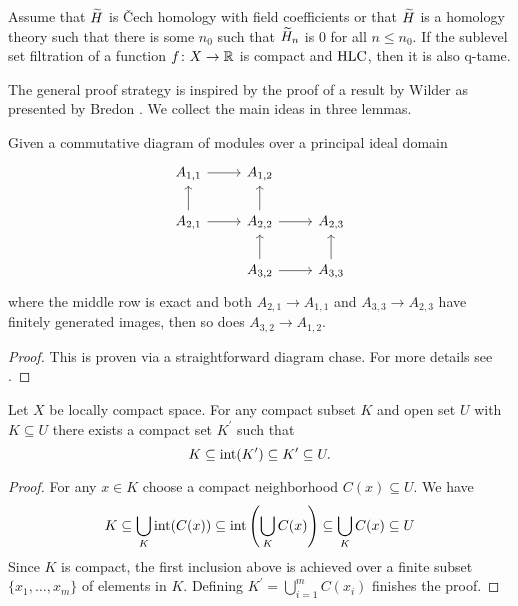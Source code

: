 \begin{thm} \label{t:strong local connectedness implies q-tameness}
	Assume that $\widetilde{H}$ is \v{C}ech homology with field coefficients or that $\widetilde{H}$ is a homology theory such that there is some $n_0$ such that $\widetilde{H}_{n}$ is 0 for all $n \leq n_0$.
	If the sublevel set filtration of a function $f \colon X \to \mathbb{R}$ is compact and $\mathrm{HLC}$, then it is also q-tame.
\end{thm}

The general proof strategy is inspired by the proof of a result by Wilder as presented by Bredon \cite[Section II.17]{Bredon.1997}.
We collect the main ideas in three lemmas.

\begin{lem} \label{l:commutative algebra}
	Given a commutative diagram of modules over a principal ideal domain
	\begin{equation*}
	\begin{tikzcd}
	A_{1,1} \arrow[r] & A_{1,2} & \\
	A_{2,1} \arrow[r] \arrow[u] & A_{2,2} \arrow[r] \arrow[u] & A_{2,3} \\
	& A_{3,2} \arrow[r] \arrow[u] & A_{3,3} \arrow[u]
	\end{tikzcd}
	\end{equation*}
	where the middle row is exact and both $A_{2,1} \to A_{1,1}$ and $A_{3,3} \to A_{2,3}$ have finitely generated images, then so does $A_{3,2} \to A_{1,2}$.
\end{lem}

\begin{proof}
	This is proven via a straightforward diagram chase. For more details see \cite[Lemma 17.3]{Bredon.1997}.
\end{proof}

\begin{lem} \label{l:neighborhood third}
	Let $X$ be locally compact space.
	For any compact subset $K$ and open set $U$ with $K \subseteq U$ there exists a compact set $K^\prime$ such that
	\begin{equation*}
	K \subseteq \operatorname{int}(K^\prime) \subseteq K^\prime \subseteq U.
	\end{equation*}
\end{lem}

\begin{proof}
	For any $x \in K$ choose a compact neighborhood $C(x) \subseteq U$.
	We have
	\begin{equation*}
	K \subseteq \bigcup_K \operatorname{int}(C(x)) \subseteq \operatorname{int}\left(\bigcup_K C(x)\right) \subseteq \bigcup_K C(x) \subseteq U
	\end{equation*}
	Since $K$ is compact, the first inclusion above is achieved over a finite subset $\{x_1, \dots, x_m\}$ of elements in $K$.
	Defining $K^\prime = \bigcup_{i=1}^m C(x_i)$ finishes the proof.
\end{proof}

